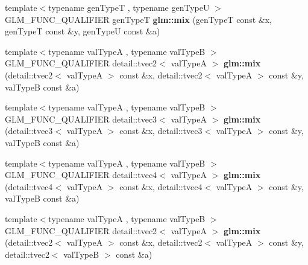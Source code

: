 \begin{DoxyCompactItemize}
\item 
\hypertarget{namespaceglm_a1edf6238dd804c3e0a9bddae41d4c9d3}{{\footnotesize template$<$typename gen\-Type\-T , typename gen\-Type\-U $>$ }\\\-G\-L\-M\-\_\-\-F\-U\-N\-C\-\_\-\-Q\-U\-A\-L\-I\-F\-I\-E\-R gen\-Type\-T {\bfseries glm\-::mix} (gen\-Type\-T const \&x, gen\-Type\-T const \&y, gen\-Type\-U const \&a)}\label{namespaceglm_a1edf6238dd804c3e0a9bddae41d4c9d3}

\item 
\hypertarget{namespaceglm_a8b1d3fcc61437749e04c3180ab5dc5cb}{{\footnotesize template$<$typename val\-Type\-A , typename val\-Type\-B $>$ }\\\-G\-L\-M\-\_\-\-F\-U\-N\-C\-\_\-\-Q\-U\-A\-L\-I\-F\-I\-E\-R \*
detail\-::tvec2$<$ val\-Type\-A $>$ {\bfseries glm\-::mix} (detail\-::tvec2$<$ val\-Type\-A $>$ const \&x, detail\-::tvec2$<$ val\-Type\-A $>$ const \&y, val\-Type\-B const \&a)}\label{namespaceglm_a8b1d3fcc61437749e04c3180ab5dc5cb}

\item 
\hypertarget{namespaceglm_abaf29c996e52b2aea7b9f48d32cb088e}{{\footnotesize template$<$typename val\-Type\-A , typename val\-Type\-B $>$ }\\\-G\-L\-M\-\_\-\-F\-U\-N\-C\-\_\-\-Q\-U\-A\-L\-I\-F\-I\-E\-R \*
detail\-::tvec3$<$ val\-Type\-A $>$ {\bfseries glm\-::mix} (detail\-::tvec3$<$ val\-Type\-A $>$ const \&x, detail\-::tvec3$<$ val\-Type\-A $>$ const \&y, val\-Type\-B const \&a)}\label{namespaceglm_abaf29c996e52b2aea7b9f48d32cb088e}

\item 
\hypertarget{namespaceglm_aefbc532fc3609f5f39a15d85f3afc442}{{\footnotesize template$<$typename val\-Type\-A , typename val\-Type\-B $>$ }\\\-G\-L\-M\-\_\-\-F\-U\-N\-C\-\_\-\-Q\-U\-A\-L\-I\-F\-I\-E\-R \*
detail\-::tvec4$<$ val\-Type\-A $>$ {\bfseries glm\-::mix} (detail\-::tvec4$<$ val\-Type\-A $>$ const \&x, detail\-::tvec4$<$ val\-Type\-A $>$ const \&y, val\-Type\-B const \&a)}\label{namespaceglm_aefbc532fc3609f5f39a15d85f3afc442}

\item 
\hypertarget{namespaceglm_a7f7ea14c70ee0608b408eed45f1e5540}{{\footnotesize template$<$typename val\-Type\-A , typename val\-Type\-B $>$ }\\\-G\-L\-M\-\_\-\-F\-U\-N\-C\-\_\-\-Q\-U\-A\-L\-I\-F\-I\-E\-R \*
detail\-::tvec2$<$ val\-Type\-A $>$ {\bfseries glm\-::mix} (detail\-::tvec2$<$ val\-Type\-A $>$ const \&x, detail\-::tvec2$<$ val\-Type\-A $>$ const \&y, detail\-::tvec2$<$ val\-Type\-B $>$ const \&a)}\label{namespaceglm_a7f7ea14c70ee0608b408eed45f1e5540}


\end{DoxyCompactItemize}
